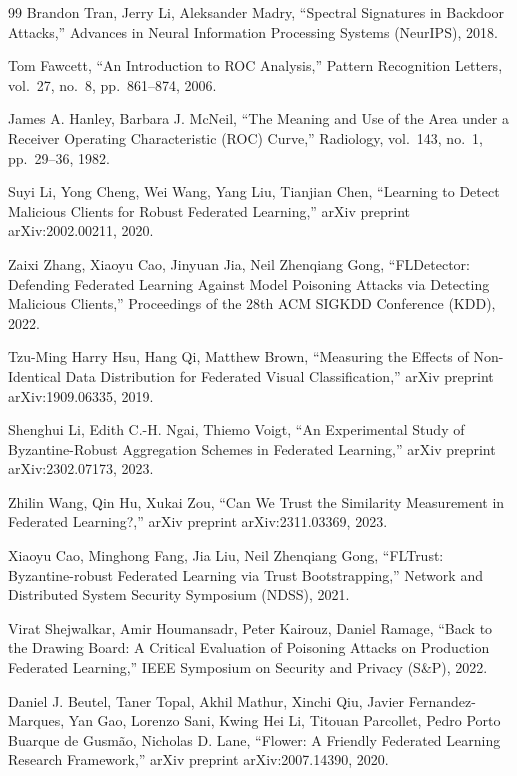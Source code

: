 \documentclass[a4j, twocolumn, dvipdfmx]{jsarticle}
\begin{document}
\begin{thebibliography}{99}
Brandon Tran, Jerry Li, Aleksander Madry,
``Spectral Signatures in Backdoor Attacks,''
Advances in Neural Information Processing Systems (NeurIPS), 2018.

Tom Fawcett,
``An Introduction to ROC Analysis,''
Pattern Recognition Letters, vol.~27, no.~8, pp.~861--874, 2006.

James A. Hanley, Barbara J. McNeil,
``The Meaning and Use of the Area under a Receiver Operating Characteristic (ROC) Curve,''
Radiology, vol.~143, no.~1, pp.~29--36, 1982.

Suyi Li, Yong Cheng, Wei Wang, Yang Liu, Tianjian Chen,
``Learning to Detect Malicious Clients for Robust Federated Learning,''
arXiv preprint arXiv:2002.00211, 2020.

Zaixi Zhang, Xiaoyu Cao, Jinyuan Jia, Neil Zhenqiang Gong,
``FLDetector: Defending Federated Learning Against Model Poisoning Attacks via Detecting Malicious Clients,''
Proceedings of the 28th ACM SIGKDD Conference (KDD), 2022.

Tzu-Ming Harry Hsu, Hang Qi, Matthew Brown,
``Measuring the Effects of Non-Identical Data Distribution for Federated Visual Classification,''
arXiv preprint arXiv:1909.06335, 2019.

Shenghui Li, Edith C.-H. Ngai, Thiemo Voigt,
``An Experimental Study of Byzantine-Robust Aggregation Schemes in Federated Learning,''
arXiv preprint arXiv:2302.07173, 2023.

Zhilin Wang, Qin Hu, Xukai Zou,
``Can We Trust the Similarity Measurement in Federated Learning?,''
arXiv preprint arXiv:2311.03369, 2023.

Xiaoyu Cao, Minghong Fang, Jia Liu, Neil Zhenqiang Gong,
``FLTrust: Byzantine-robust Federated Learning via Trust Bootstrapping,''
Network and Distributed System Security Symposium (NDSS), 2021.

Virat Shejwalkar, Amir Houmansadr, Peter Kairouz, Daniel Ramage,
``Back to the Drawing Board: A Critical Evaluation of Poisoning Attacks on Production Federated Learning,''
IEEE Symposium on Security and Privacy (S\&P), 2022.

Daniel J. Beutel, Taner Topal, Akhil Mathur, Xinchi Qiu, Javier Fernandez-Marques, Yan Gao, Lorenzo Sani, Kwing Hei Li, Titouan Parcollet, Pedro Porto Buarque de Gusm\~{a}o, Nicholas D. Lane,
``Flower: A Friendly Federated Learning Research Framework,''
arXiv preprint arXiv:2007.14390, 2020.

\end{thebibliography}
\end{document}
